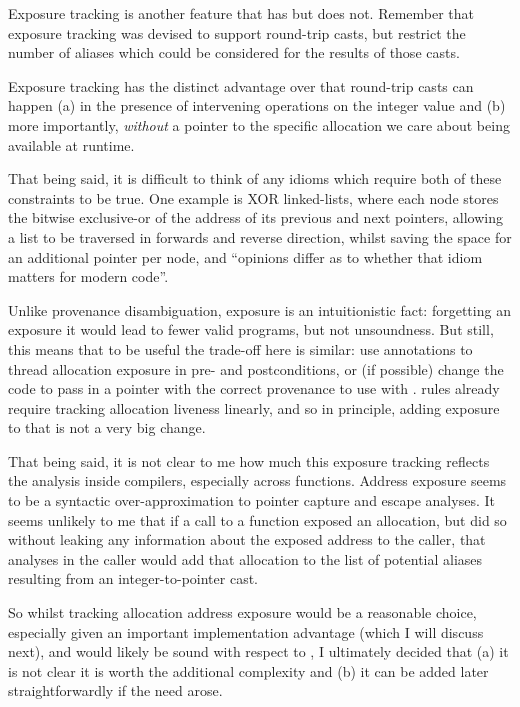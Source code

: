 Exposure tracking is another feature that  has but 
does not. Remember that exposure tracking was devised to support round-trip
casts, but restrict the number of aliases which could be considered for the
results of those casts.

Exposure tracking has the distinct advantage over  that round-trip
casts can happen (a) in the presence of intervening operations on the integer
value and (b) more importantly, \emph{without} a pointer to the specific
allocation we care about being available at runtime.

That being said, it is difficult to think of any idioms which require both of
these constraints to be true. One example is XOR linked-lists, where each node
stores the bitwise exclusive-or of the address of its previous and next
pointers, allowing a list to be traversed in forwards and reverse direction,
whilst saving the space for an additional pointer per node, and ``opinions
differ as to whether that idiom matters for modern
code''.

Unlike provenance disambiguation, exposure is an intuitionistic fact:
forgetting an exposure it would lead to fewer valid programs, but not
unsoundness. But still, this means that to be useful the trade-off here is
similar: use annotations to thread allocation exposure in pre- and
postconditions, or (if possible) change the code to pass in a pointer with the
correct provenance to use with .  rules
already require tracking allocation liveness linearly, and so in principle,
adding exposure to that is not a very big change.

That being said, it is not clear to me how much this exposure tracking reflects
the analysis inside compilers, especially across functions. Address exposure
seems to be a syntactic over-approximation to pointer capture and escape
analyses.
It seems unlikely to me that if a call to a function exposed an
allocation, but did so without leaking any information about the exposed
address to the caller, that analyses in the caller would add that allocation to
the list of potential aliases resulting from an integer-to-pointer cast.

So whilst tracking allocation address exposure would be a reasonable choice,
especially given an important implementation advantage (which I will discuss
next), and would likely be sound with respect to , I ultimately
decided that (a) it is not clear it is worth the additional complexity and (b)
it can be added later straightforwardly if the need arose.

